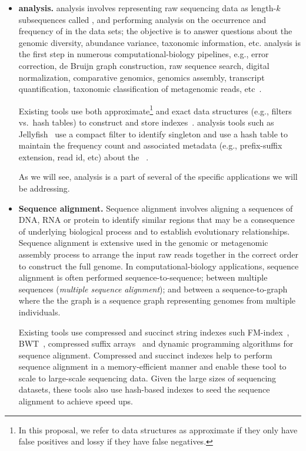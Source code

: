 \begin{itemize}[leftmargin=*]

\item {\bf \Kmer analysis.}
\Kmer analysis involves representing raw sequencing data as length-$k$ subsequences called \kmers, and performing analysis on the occurrence and frequency of \kmers in the data sets; the objective is to answer questions about the genomic diversity, abundance variance, taxonomic information, etc. \Kmer analysis is the first step in numerous computational-biology pipelines, e.g., error correction, de Bruijn graph construction, raw sequence search, digital normalization, comparative genomics, genomics assembly, transcript quantification, taxonomic classification of metagenomic reads, etc~\cite{xxxx}.

Existing tools use both  approximate\footnote{In this proposal, we refer to data structures as approximate if they only have false positives and lossy if they have false negatives.} and exact data structures (e.g., filters vs.\ hash tables) to construct and store \kmer indexes~\cite{MarccaisKi11,PandeyBJP17a}.  \kmer analysis tools such as  Jellyfish~\cite{MarccaisKi11} use a compact filter to identify singleton \kmers and use a hash table to maintain the frequency count and associated metadata (e.g., prefix-suffix extension, read id, etc) about the \kmers~\cite{xxx}.

As we will see, \kmer analysis is a part of several of the specific applications we will be addressing.


\item {\bf Sequence alignment.} Sequence alignment involves aligning a sequences of DNA, RNA or protein to identify similar regions that may be a consequence of underlying biological process and to establish evolutionary relationships.
Sequence alignment is extensive used in the genomic or metagenomic assembly process to arrange the input raw reads together in the correct order to construct the full genome. In computational-biology applications, sequence alignment is often performed sequence-to-sequence; between multiple sequences (\emph{multiple sequence alignment}); and between a sequence-to-graph where the the graph is a sequence graph representing genomes from multiple individuals. 

Existing tools use compressed and succinct string indexes such FM-index~\cite{ferragina2000opportunistic}, BWT~\cite{burrows1994block}, compressed suffix arrays~\cite{grossi2000compressed} and dynamic programming algorithms for sequence alignment. 
Compressed and succinct indexes help to perform sequence alignment in a memory-efficient manner and enable these tool to scale to large-scale sequencing data.
Given the large sizes of sequencing datasets, these tools also use hash-based \kmer indexes to seed the sequence alignment to achieve speed ups.


\end{itemize}

